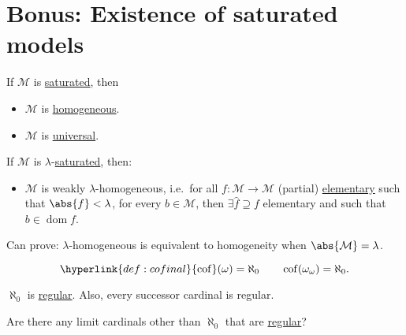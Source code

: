 \documentclass{article}
\makeatletter
\DeclareMathOperator{\dom}{dom}
\DeclareMathOperator{\img}{img}
\DeclareMathOperator{\cof}{cof}
\newcommand{\bonusnamed}[1]{\textbf{#1}\index{#1@*#1}}
\newcommand{\M}{\mathcal{M}}
\makeatother
\begin{document}
\section{Bonus: Existence of saturated models}
If $\mathcal{M}$ is \hyperlink{def:sat}{saturated}, then
\begin{itemize}
  \item $\mathcal{M}$ is \hyperlink{def:homogeneous}{homogeneous}.
  \item $\mathcal{M}$ is \hyperlink{def:univ}{universal}.
\end{itemize}
If $\M$ is $\lambda$-\hyperlink{def:sat}{saturated}, then:
\begin{itemize}
  \item $\M$ is weakly $\lambda$-homogeneous, i.e.\ for all $f:\M \to \M$ (partial) \hyperlink{def:elmap}{elementary} such that $\abs{f} < \lambda$, for every $b \in \M$, then $\exists \hat{f} \supseteq f$ elementary and such that $b \in \dom f$.
\end{itemize}
Can prove: $\lambda$-homogeneous is equivalent to homogeneity when $\abs{\M} = \lambda$.
\begin{eg}
  \begin{equation*}
    \hyperlink{def:cofinal}{\cof}(\omega) = \aleph_0 \qquad \cof(\omega_\omega) = \aleph_0.
  \end{equation*}
\end{eg}
\begin{eg}
  $\aleph_0$ is \hyperlink{def:regular}{regular}.  Also, every successor cardinal is regular.
\end{eg}
Are there any limit cardinals other than $\aleph_0$ that are \hyperlink{def:regular}{regular}?
\end{document}

